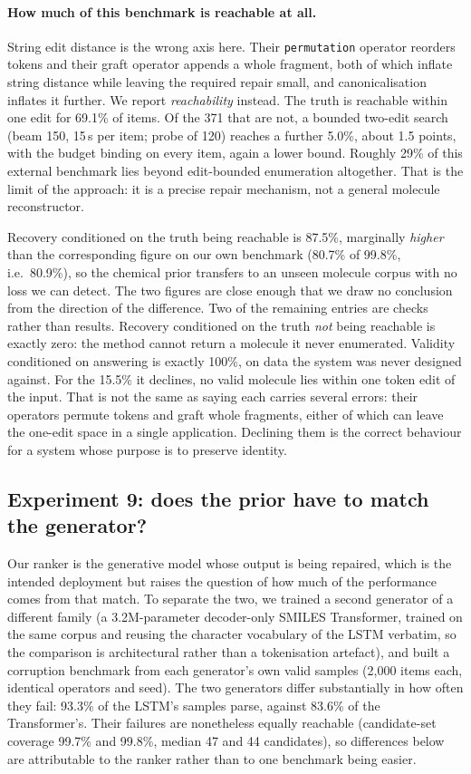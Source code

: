 \documentclass[11pt]{article}
\begin{document}
\paragraph{How much of this benchmark is reachable at all.}
String edit distance is the wrong axis here. Their \texttt{permutation} operator
reorders tokens and their graft operator appends a whole fragment, both of which
inflate string distance while leaving the required repair small, and
canonicalisation inflates it further. We report \emph{reachability} instead. The truth is reachable within one edit for 69.1\% of items. Of the 371
that are not, a bounded two-edit search (beam 150, 15\,s per item; probe of 120)
reaches a further 5.0\%, about 1.5 points, with the budget binding on every
item, again a lower bound. Roughly 29\% of this external benchmark lies beyond
edit-bounded enumeration altogether. That is the limit of the approach: it is a
precise repair mechanism, not a general molecule reconstructor.

\noindent
Recovery conditioned on the truth being reachable is 87.5\%, marginally
\emph{higher} than the corresponding figure on our own benchmark (80.7\% of
99.8\%, i.e.\ 80.9\%), so the chemical prior transfers to an unseen molecule
corpus with no loss we can detect. The two figures are close enough that we
draw no conclusion from the direction of the difference. Two of the remaining entries are checks rather than
results. Recovery conditioned on the truth \emph{not} being reachable is exactly
zero: the method cannot return a molecule it never enumerated. Validity
conditioned on answering is exactly 100\%, on data the system was never designed
against. For the 15.5\% it declines, no valid molecule lies within one token
edit of the input. That is not the same as saying each carries several errors:
their operators permute tokens and graft whole fragments, either of which can
leave the one-edit space in a single application. Declining them is the correct
behaviour for a system whose purpose is to preserve identity.

\subsection{Experiment 9: does the prior have to match the generator?}\label{sec:exp9}

Our ranker is the generative model whose output is being repaired, which is the
intended deployment but raises the question of how much of the performance comes
from that match. To separate the two, we trained a second generator of a
different family (a 3.2M-parameter decoder-only SMILES Transformer, trained on
the same corpus and reusing the character vocabulary of the LSTM verbatim, so
the comparison is architectural rather than a tokenisation artefact), and built a
corruption benchmark from each generator's own valid samples (2{,}000 items
each, identical operators and seed). The two generators differ substantially in
how often they fail: 93.3\% of the LSTM's samples parse, against 83.6\% of the
Transformer's. Their failures are nonetheless equally reachable (candidate-set
coverage 99.7\% and 99.8\%, median 47 and 44 candidates), so differences below
are attributable to the ranker rather than to one benchmark being easier.
\end{document}
